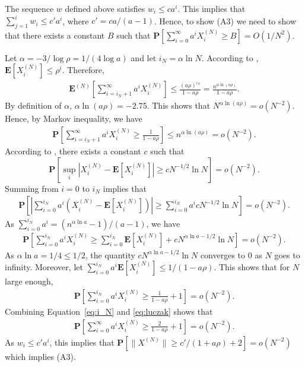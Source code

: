\documentclass[sigconf]{acmart}
\newcommand\XN{X^{(N)}}
\newcommand\esp[1]{\mathbf{E}\left[#1\right]}
\newcommand\sesp[1]{\mathbf{E}[#1]}
\newcommand\espN[1]{\mathbf{E}^{(N)}\left[#1\right]}
\newcommand\Proba[1]{\mathbf{P}\left[#1\right]}
\newcommand\sProba[1]{\mathbf{P}[#1]}
\newcommand\snorm[1]{\|#1\|}
\newcommand\abs[1]{\left|#1\right|}
\begin{document}
The sequence $w$ defined above satisfies $w_i\le c a^i$. This implies
that $\sum_{j=1}^i w_i\le c' a^i$, where $c'=ca/(a-1)$. Hence, to show
(A3) we need to show that there exists a constant $B$ such that
$\sProba{\sum_{i=0}^\infty a^i\XN_i\ge B}=O(1/N^2)$.


Let $\alpha=-3/\log\rho=1/(4\log a)$ and let $i_N=\alpha\ln N$.
According to \cite[Equation~5.3]{vvedenskaya1996queueing},
$\sesp{\XN_i}\le \rho^i$. Therefore,
\begin{align*}
  \espN{\sum_{i=i_N+1}^{\infty} a^i \XN_i}\le
  \frac{(a\rho)^{i_N}}{1-a\rho}=\frac{n^{\alpha \ln(a\rho)}}{1-a\rho}.
\end{align*}
By definition of $\alpha$, $\alpha \ln(a\rho)=-2.75$. This shows that
$N^{\alpha \ln(a\rho)}=o(N^{-2})$.  Hence, by Markov inequality, we
have
\begin{align}
  \Proba{\sum_{i=i_N+1}^{\infty} a^i \XN_i\ge \frac{1}{1-a\rho}} \le
  n^{\alpha\ln(a\rho)} = o(N^{-2}). 
  \label{eq:i_N}
\end{align}
According to \cite[Lemma~2.6]{luczak2007asymptotic}, there exists a
constant $c$ such that 
\begin{equation*}
  \Proba{\sup_{i}\abs{\XN_i-\esp{\XN_i}}\ge cN^{-1/2}\ln N} = o(N^{-2}).
\end{equation*}
Summing from $i=0$ to $i_N$ implies that 
\begin{align*}
  \Proba{\abs{\sum_{i=0}^{i_N}a^i(\XN_i-\esp{\XN_i})}\ge
  \sum_{i=0}^{i_N}a^icN^{-1/2}\ln N} = o(N^{-2}). 
\end{align*}
As $\sum_{i=0}^{i_N}a^i=(n^{\alpha\ln a}-1)/(a-1)$, we have 
\begin{align*}
  \Proba{\sum_{i=0}^{i_N}a^i\XN_i\ge \sum_{i=0}^{i_N}\esp{\XN_i}+
  cN^{\alpha \ln a-1/2}\ln N} = o(N^{-2}). 
\end{align*}
As $\alpha \ln a=1/4\le 1/2$, the quantity
$cN^{\alpha \ln a-1/2}\ln N$ converges to $0$ as $N$ goes to
infinity. Moreover, let
$\sum_{i=0}^{i_N}a^i\sesp{\XN_i}\le 1/(1-a\rho)$. This shows that for
$N$ large enough, 
\begin{align}
  \Proba{\sum_{i=0}^{i_N}a^i\XN_i\ge \frac{1}{1-a\rho}+1} =
  o(N^{-2}).
  \label{eq:luczak}  
\end{align}
Combining Equation~\eqref{eq:i_N} and \eqref{eq:luczak}  shows that 
\begin{align*}
  \Proba{\sum_{i=0}^\infty a^i \XN_i\ge \frac{2}{1-a\rho}+1}
  =o(N^{-2}).
\end{align*}
As $w_i\le c'a^i$, this implies that $\sProba{\snorm{\XN}\ge
  c'/(1+a\rho)+2}=o(N^{-2})$ which implies (A3). 
\end{document}
